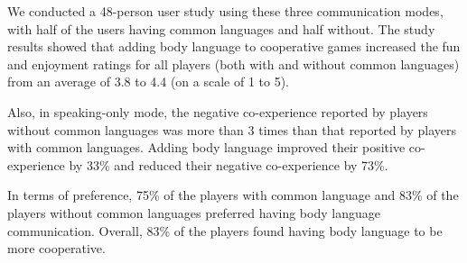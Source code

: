 We conducted a 48-person user study using these three communication modes, with half of the users having common languages and half without.
The study results showed that adding body language to cooperative games increased the fun and enjoyment ratings for all players (both with and without common languages) from an average of 3.8 to 4.4 (on a scale of 1 to 5). 

Also, in speaking-only mode, the negative co-experience reported by players without common languages was more than 3 times than that reported by players with common languages. Adding body language improved their positive co-experience by 33\% and reduced their negative co-experience by 73\%. 

In terms of preference, 75\% of the players with common language and 83\% of the players without common languages preferred having body language communication. Overall, 83\% of the players found having body language to be more cooperative.





